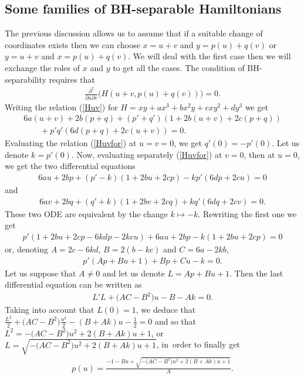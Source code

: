 \documentclass[10pt,a4paper]{amsart}
\numberwithin{equation}{section}
\begin{document}
\subsection{Some families of BH-separable Hamiltonians}

The previous discussion allows us to assume that if a suitable change of coordinates exists then we can choose $x=u+v$ and $y=p(u)+q(v)$ or $y=u+v$ and $x=p(u)+q(v)$. We will deal with the first case then we will exchange the roles of $x$ and $y$ to get all the cases. The condition of BH-separability requires that
\begin{gather}\label{Huv}
\frac{\partial^2}{\partial u\partial v}\big(H(u+v,p(u)+q(v))\big)=0.
\end{gather}
Writing the relation (\ref{Huv}) for $H=xy+ax^3+bx^2y+cxy^2+dy^3$ we get
\begin{gather}
6a(u+v)+2b(p+q)+(p'+q')(1+2b(u+v)+2c(p+q))\nonumber
\\ \qquad
{}+p'q'(6d(p+q)+2c(u+v))=0.\label{Huvfor}
\end{gather}
Evaluating the relation (\ref{Huvfor})
at $u=v=0$, we get $q'(0)=-p'(0)$. Let us denote $k=p'(0)$.
Now, evaluating separately (\ref{Huvfor}) at $v=0$, then at $u=0$, we get the two differential equations
\begin{gather*}
6au+2bp+(p'-k)(1+2bu+2cp)-kp'(6dp+2cu)=0
\end{gather*}
and
\begin{gather*}
6av+2bq+(q'+k)(1+2bv+2cq)+kq'(6dq+2cv)=0.
\end{gather*}
These two ODE are equivalent by the change $k\mapsto-k$.
Rewriting the first one we get
\begin{gather*}
p'(1+2bu+2cp-6kdp-2kcu)+6au+2bp-k(1+2bu+2cp)=0
\end{gather*}
or, denoting $A=2c-6kd$, $B=2(b-kc)$ and $C=6a-2kb$,
\begin{gather*}
p'(Ap+Bu+1)+Bp+Cu-k=0.
\end{gather*}
Let us suppose that $A\not=0$ and let us denote $L=Ap+Bu+1$. Then the last differential equation can be written as
\begin{gather*}
L'L+\big(AC-B^2\big)u-B-Ak=0.
\end{gather*}
Taking into account that $L(0)=1$, we deduce that
$\frac{L^2}{2}+\big(AC-B^2\big)\frac{u^2}2-(B+Ak)u-\frac12=0$ and so
that
$L^2=-\big(AC-B^2\big)u^2+2(B+Ak)u+1$, or
$L=\sqrt{-\big(AC-B^2\big)u^2+2(B+Ak)u+1}$, in~order to finally get
\begin{gather}\label{pu}
p(u)=\frac{-1-Bu+\sqrt{-\big(AC-B^2\big)u^2+2(B+Ak)u+1}}{A}.
\end{gather}
\end{document}
